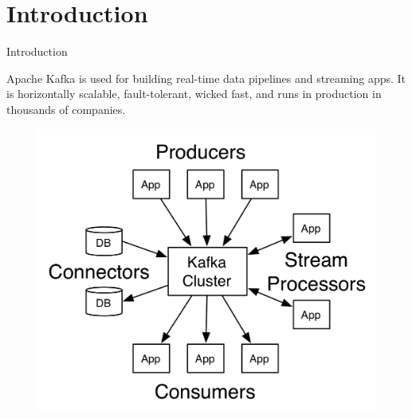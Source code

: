 \section{Introduction}
\begin{frame}[plain,t]{Introduction} %
	  \vspace{2ex}

   Apache Kafka is used for building real-time data pipelines and streaming apps. It is horizontally scalable, fault-tolerant, wicked fast, and runs in production in thousands of companies.
    

\begin{figure}
    \centering
    \includegraphics[width=0.7\linewidth]{image/0101}
    \label{fig:0101}
\end{figure}
\end{frame}


